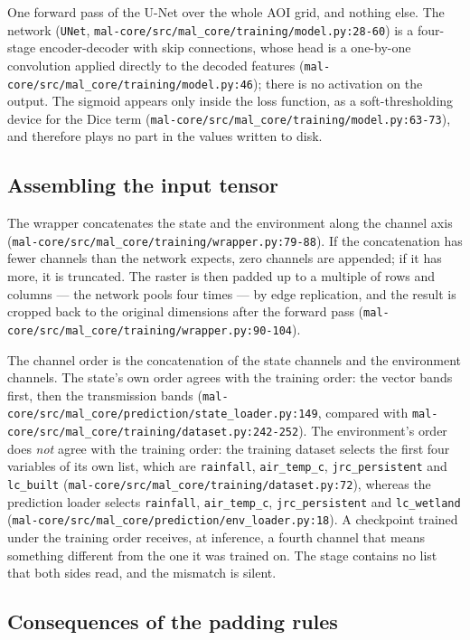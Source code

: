 \documentclass[11pt,a4paper]{article}
\newcommand{\code}[1]{\texttt{#1}}
\begin{document}
One forward pass of the U-Net over the whole AOI grid, and nothing else. The
network (\code{UNet}, \code{mal-core/src/mal\_core/training/model.py:28-60})
is a four-stage encoder-decoder with skip connections, whose head is a
one-by-one convolution applied directly to the decoded features
(\code{mal-core/src/mal\_core/training/model.py:46}); there is no activation
on the output. The sigmoid appears only inside the loss function, as a
soft-thresholding device for the Dice term
(\code{mal-core/src/mal\_core/training/model.py:63-73}), and therefore plays
no part in the values written to disk.

\subsection{Assembling the input tensor}

The wrapper concatenates the state and the environment along the channel axis
(\code{mal-core/src/mal\_core/training/wrapper.py:79-88}). If the
concatenation has fewer channels than the network expects, zero channels are
appended; if it has more, it is truncated. The raster is then padded up to a
multiple of  rows and columns --- the network pools four times --- by
edge replication, and the result is cropped back to the original dimensions
after the forward pass
(\code{mal-core/src/mal\_core/training/wrapper.py:90-104}).

The channel order is the concatenation of the state channels and the
environment channels. The state's own order agrees with the training order:
the vector bands first, then the transmission bands
(\code{mal-core/src/mal\_core/prediction/state\_loader.py:149}, compared with
\code{mal-core/src/mal\_core/training/dataset.py:242-252}). The environment's
order does \emph{not} agree with the training order: the training dataset
selects the first four variables of its own list, which are
\code{rainfall}, \code{air\_temp\_c}, \code{jrc\_persistent} and
\code{lc\_built}
(\code{mal-core/src/mal\_core/training/dataset.py:72}), whereas the
prediction loader selects \code{rainfall}, \code{air\_temp\_c},
\code{jrc\_persistent} and \code{lc\_wetland}
(\code{mal-core/src/mal\_core/prediction/env\_loader.py:18}). A checkpoint
trained under the training order receives, at inference, a fourth channel
that means something different from the one it was trained on. The stage
contains no list that both sides read, and the mismatch is silent.

\subsection{Consequences of the padding rules}
\end{document}
